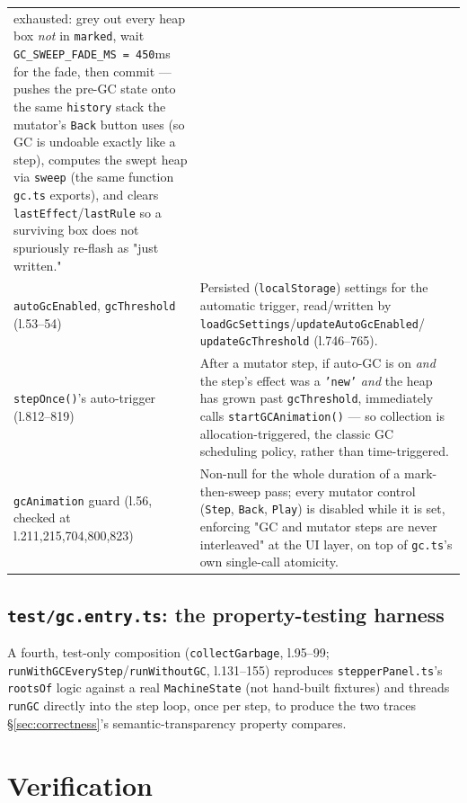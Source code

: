 \documentclass[11pt]{article}
\begin{document}
\begin{center}
\begin{tabular}{@{}p{4.4cm}p{11.2cm}@{}}
  exhausted: grey out every heap box \emph{not} in \texttt{marked}, wait
  \texttt{GC\_SWEEP\_FADE\_MS = 450}ms for the fade, then commit --- pushes
  the pre-GC state onto the same \texttt{history} stack the mutator's
  \texttt{Back} button uses (so GC is undoable exactly like a step),
  computes the swept heap via \texttt{sweep} (the same function
  \texttt{gc.ts} exports), and clears \texttt{lastEffect}/\texttt{lastRule}
  so a surviving box does not spuriously re-flash as "just written." \\
\texttt{autoGcEnabled}, \texttt{gcThreshold} (l.53--54) & Persisted
  (\texttt{localStorage}) settings for the automatic trigger, read/written
  by \texttt{loadGcSettings}/\texttt{updateAutoGcEnabled}/
  \texttt{updateGcThreshold} (l.746--765). \\
\texttt{stepOnce()}'s auto-trigger (l.812--819) & After a mutator step,
  if auto-GC is on \emph{and} the step's effect was a \texttt{'new'}
  \emph{and} the heap has grown past \texttt{gcThreshold}, immediately
  calls \texttt{startGCAnimation()} --- so collection is allocation-triggered,
  the classic GC scheduling policy, rather than time-triggered. \\
\texttt{gcAnimation} guard (l.56, checked at l.211,215,704,800,823) &
  Non-null for the whole duration of a mark-then-sweep pass; every mutator
  control (\texttt{Step}, \texttt{Back}, \texttt{Play}) is disabled while
  it is set, enforcing "GC and mutator steps are never interleaved" at the
  UI layer, on top of \texttt{gc.ts}'s own single-call atomicity. \\
\bottomrule
\end{tabular}
\end{center}

\subsection{\texttt{test/gc.entry.ts}: the property-testing harness}

A fourth, test-only composition (\texttt{collectGarbage}, l.95--99;
\texttt{runWithGCEveryStep}/\texttt{runWithoutGC}, l.131--155) reproduces
\texttt{stepperPanel.ts}'s \texttt{rootsOf} logic against a real
\texttt{MachineState} (not hand-built fixtures) and threads \texttt{runGC}
directly into the step loop, once per step, to produce the two traces
\S\ref{sec:correctness}'s semantic-transparency property compares.

\section{Verification}
\label{sec:tests}
\end{document}
